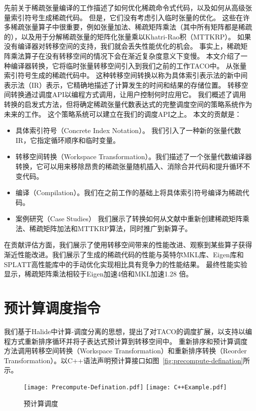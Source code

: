 \begin{translation}
先前关于稀疏张量编译的工作描述了如何优化稀疏命令式代码，以及如何从高级张量索引符号生成稀疏代码。 但是，它们没有考虑引入临时张量的优化。 
这些在许多稀疏张量算子中很重要，例如张量加法、稀疏矩阵乘法（其中所有矩阵都是稀疏的），以及用于分解稀疏张量的矩阵化张量乘以Khatri-Rao积（MTTKRP）。 
如果没有编译器对转移空间的支持，我们就会丢失性能优化的机会。 事实上，稀疏矩阵乘法算子在没有转移空间的情况下会在渐近复杂度意义下变慢。
本文介绍了一种编译器转换，它将临时张量转移空间引入到我们之前的工作TACO中。 从张量索引符号生成的稀疏代码中。 
这种转移空间转换以称为具体索引表示法的新中间表示法（IR）表示，它精确地描述了计算发生的时间和结果的存储位置。 
转移空间转换通过调度API以编程方式调用，让用户控制何时应用它。 我们概述了调用转换的启发式方法，但将确定稀疏张量代数表达式的完整调度空间的策略系统作为未来的工作。 
这个策略系统可以建立在我们的调度API之上。
本文的贡献是：
\begin{itemize}
 \item 具体索引符号（Concrete Index Notation）。 我们引入了一种新的张量代数IR，它指定循环顺序和临时变量。
 \item 转移空间转换（Workspace Transformation）。我们描述了一个张量代数编译器转换，它可以用来移除昂贵的稀疏张量随机插入、消除合并代码和提升循环不变代码。
 \item 编译（Compilation）。我们在之前工作的基础上将具体索引符号编译为稀疏代码。
 \item 案例研究（Case Studies） 我们展示了转换如何从文献中重新创建稀疏矩阵乘法、稀疏矩阵加法和MTTKRP算法，同时推广到新算子。
\end{itemize}
在贡献评估方面，我们展示了使用转移空间带来的性能改进、观察到某些算子获得渐近性能改进。我们展示了生成的稀疏代码的性能与英特尔MKL库、Eigen库和SPLATT高性能库中的手动优化实现相比具有竞争力的性能结果。
最终性能实验显示，稀疏矩阵乘法相较于Eigen加速4倍和MKL加速1.28 倍。


\section{预计算调度指令}
我们基于Halide中计算-调度分离的思想，提出了对TACO的调度扩展，以支持以编程方式重新排序循环并将子表达式预计算到转移空间中。 
重新排序和预计算调度方法调用转移空间转换（Workspace Transformation）和重新排序转换（Reorder Transformation）。以C++语法声明预计算接口如图~\ref{fig:precompute-defination}所示。
\begin{figure}
  \centering
    {\texttt{[image: Precompute-Defination.pdf]}}
    {\texttt{[image: C++Example.pdf]}}
  \caption{预计算调度}
  \label{fig:precomputes}
\end{figure}



\end{translation}
